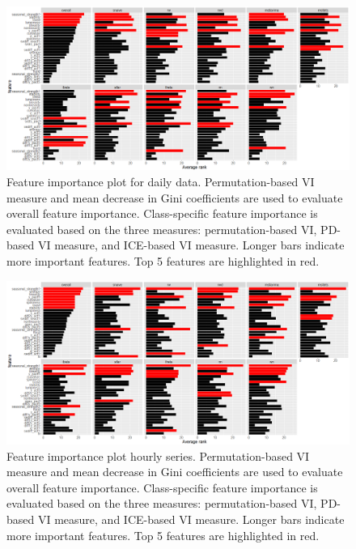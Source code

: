 \documentclass[11pt,a4paper,]{article}
\begin{document}
\begin{figure}[h]

{\centering \includegraphics{figures/vidaily-1} 

}

\caption{Feature importance plot for daily data. Permutation-based VI measure and mean decrease in Gini coefficients are used to evaluate overall feature importance. Class-specific feature importance is evaluated based on the three measures: permutation-based VI, PD-based VI measure, and ICE-based VI measure. Longer bars indicate more important features. Top 5 features are highlighted in red.}\label{fig:vidaily}
\end{figure}

\begin{figure}
\centering
\includegraphics{figures/vihourly-1.png}
\caption{\label{fig:vihourly}Feature importance plot hourly series.
Permutation-based VI measure and mean decrease in Gini coefficients are
used to evaluate overall feature importance. Class-specific feature
importance is evaluated based on the three measures: permutation-based
VI, PD-based VI measure, and ICE-based VI measure. Longer bars indicate
more important features. Top 5 features are highlighted in red.}
\end{figure}
\end{document}
